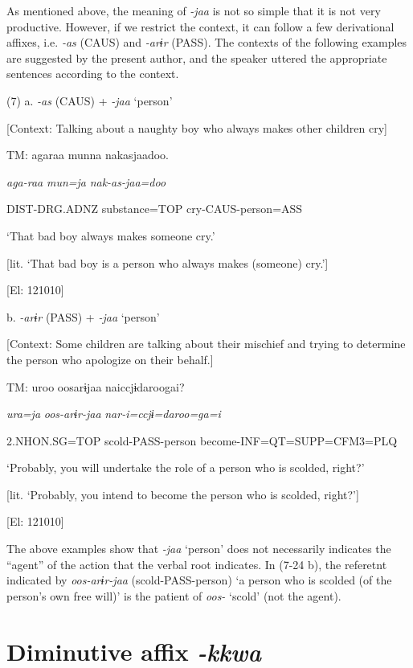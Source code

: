 As mentioned above, the meaning of \textit{{}-jaa} is not so simple that it is not very productive. However, if we restrict the context, it can follow a few derivational affixes, i.e. \textit{{}-as} (CAUS) and \textit{{}-arɨr} (PASS). The contexts of the following examples are suggested by the present author, and the speaker uttered the appropriate sentences according to the context.

(7)  a.  \textit{{}-as} (CAUS) + \textit{{}-jaa} ‘person’

    [Context: Talking about a naughty boy who always makes other children cry]

    TM:  agaraa  munna  nakasjaadoo.

      \textit{aga-raa}  \textit{mun=ja}  \textit{nak-as-jaa=doo}

      DIST-DRG.ADNZ  substance=TOP  cry-CAUS-person=ASS

      ‘That bad boy always makes someone cry.’

[lit. ‘That bad boy is a person who always makes (someone) cry.’]

      [El: 121010]

  b.  \textit{{}-arɨr} (PASS) + \textit{{}-jaa} ‘person’

    [Context: Some children are talking about their mischief and trying to determine the person who apologize on their behalf.]

    TM:  uroo  oosarɨjaa  naiccjɨdaroogai?

      \textit{ura=ja}  \textit{oos-arɨr-jaa}  \textit{nar-i=ccjɨ=daroo=ga=i}

      2.NHON.SG=TOP  scold-PASS-person  become-INF=QT=SUPP=CFM3=PLQ

      ‘Probably, you will undertake the role of a person who is scolded, right?’

[lit. ‘Probably, you intend to become the person who is scolded, right?’]

      [El: 121010]

The above examples show that \textit{{}-jaa} ‘person’ does not necessarily indicates the “agent” of the action that the verbal root indicates. In (7-24 b), the referetnt indicated by \textit{oos-arɨr-jaa} (scold-PASS-person) ‘a person who is scolded (of the person’s own free will)’ is the patient of \textit{oos-} ‘scold’ (not the agent).

\section{Diminutive affix \textit{{}-kkwa}}

